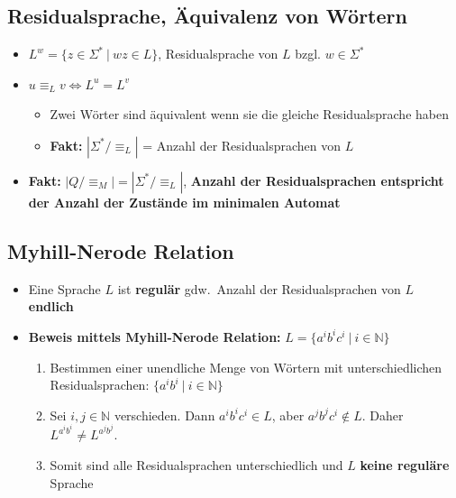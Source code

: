 \documentclass[ieeetran]{article}
\begin{document}
\subsection{Residualsprache, Äquivalenz von Wörtern} %
\label{sub:residualsprache}

\begin{itemize}
	\item $L^w = \{z \in \Sigma^* \ | \ wz \in L\}$, Residualsprache von $L$ bzgl. $w \in \Sigma^*$
	\item $u \equiv_L v \Leftrightarrow L^u = L^v$
		\begin{itemize}
		  \item Zwei Wörter sind äquivalent wenn sie die gleiche Residualsprache haben
		\item \textbf{Fakt:} $|\Sigma^*/\!\equiv_L\!|$ = Anzahl der Residualsprachen von $L$
		\end{itemize}

\item \textbf{Fakt:} $|Q/\!\equiv_M\!| = |\Sigma^*/\!\equiv_L\!|$, \textbf{Anzahl der Residualsprachen entspricht der Anzahl der Zustände im minimalen Automat} 
\end{itemize}

\subsection{Myhill-Nerode Relation} %
\label{sub:myhill_nerode_relation}
\begin{itemize}
   \item Eine Sprache $L$ ist \textbf{regulär} gdw.\ Anzahl der Residualsprachen von $L$ \textbf{endlich} 

   \item \textbf{Beweis mittels Myhill-Nerode Relation:} $L=\{a^ib^ic^i \ | \ i \in \mathbb{N}\}$
	   \begin{enumerate}
		   \item Bestimmen einer unendliche Menge von Wörtern mit unterschiedlichen Residualsprachen: $\{a^ib^i \ | \ i \in \mathbb{N}\}$
		   \item Sei $i,j \in \mathbb{N}$ verschieden. Dann $a^ib^ic^i \in L$, aber $a^jb^jc^i \not\in L$. Daher $L^{a^ib^i} \neq L^{a^jb^j}$.
		\item Somit sind alle Residualsprachen unterschiedlich und $L$ \textbf{keine reguläre} Sprache
	   \end{enumerate}
\end{itemize}
\end{document}
